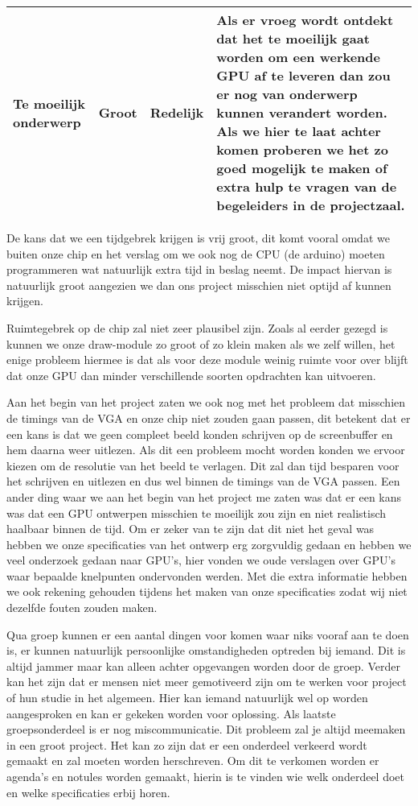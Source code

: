 \documentclass{scrartcl} %
\begin{document}
\begin{table}[H]
\begin{tabular}{|p{}|l|l|p{}|}
		\hline
		Te moeilijk onderwerp	& Groot	& Redelijk	& Als er vroeg wordt ontdekt dat het te moeilijk gaat worden om een werkende GPU af te leveren dan zou er nog van onderwerp kunnen verandert worden. Als we hier te laat achter komen proberen we het zo goed mogelijk te maken of extra hulp te vragen van de begeleiders in de projectzaal.\\
		\hline
	\end{tabular}
\end{table}

De kans dat we een tijdgebrek krijgen is vrij groot, dit komt vooral omdat we buiten onze chip en het verslag om we ook nog de CPU (de arduino) moeten programmeren wat natuurlijk extra tijd in beslag neemt. De impact hiervan is natuurlijk groot aangezien we dan ons project misschien niet optijd af kunnen krijgen.

Ruimtegebrek op de chip zal niet zeer plausibel zijn. Zoals al eerder gezegd is kunnen we onze draw-module zo groot of zo klein maken als we zelf willen, het enige probleem hiermee is dat als voor deze module weinig ruimte voor over blijft dat onze GPU dan minder verschillende soorten opdrachten kan uitvoeren.

Aan het begin van het project zaten we ook nog met het probleem dat misschien de timings van de VGA en onze chip niet zouden gaan passen, dit betekent dat er een kans is dat we geen compleet beeld konden schrijven op de screenbuffer en hem daarna weer uitlezen. Als dit een probleem mocht worden konden we ervoor kiezen om de resolutie van het beeld te verlagen. Dit zal dan tijd besparen voor het schrijven en uitlezen en dus wel binnen de timings van de VGA passen. Een ander ding waar we aan het begin van het project me zaten was dat er een kans was dat een GPU ontwerpen misschien te moeilijk zou zijn en niet realistisch haalbaar binnen de tijd. Om er zeker van te zijn dat dit niet het geval was hebben we onze specificaties van het ontwerp erg zorgvuldig gedaan en hebben we veel onderzoek gedaan naar GPU's, hier vonden we oude verslagen over GPU's waar bepaalde knelpunten ondervonden werden. Met die extra informatie hebben we ook rekening gehouden tijdens het maken van onze specificaties zodat wij niet dezelfde fouten zouden maken.

Qua groep kunnen er een aantal dingen voor komen waar niks vooraf aan te doen is, er kunnen natuurlijk persoonlijke omstandigheden optreden bij iemand. Dit is altijd jammer maar kan alleen achter opgevangen worden door de groep. Verder kan het zijn dat er mensen niet meer gemotiveerd zijn om te werken voor project of hun studie in het algemeen. Hier kan iemand natuurlijk wel op worden aangesproken en kan er gekeken worden voor oplossing. Als laatste groepsonderdeel is er nog miscommunicatie. Dit probleem zal je altijd meemaken in een groot project. Het kan zo zijn dat er een onderdeel verkeerd wordt gemaakt en zal moeten worden herschreven. Om dit te verkomen worden er agenda's en notules worden gemaakt, hierin is te vinden wie welk onderdeel doet en welke specificaties erbij horen.
\end{document}
